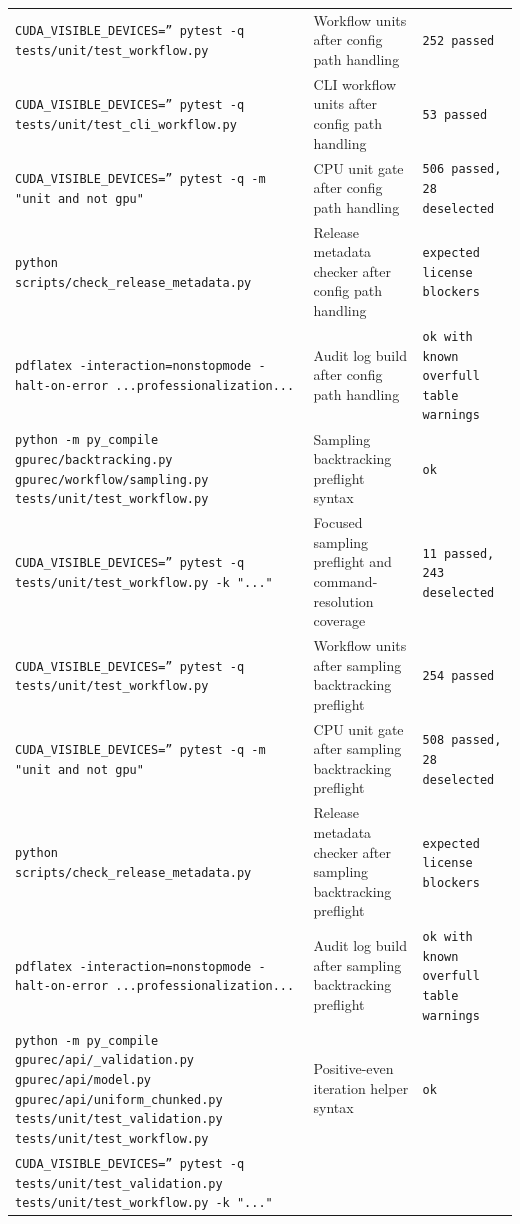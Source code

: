 \documentclass[11pt]{article}
\begin{document}
\begin{center}
\begin{tabular}{lll}
\texttt{CUDA\_VISIBLE\_DEVICES='' pytest -q tests/unit/test\_workflow.py} &
Workflow units after config path handling &
\texttt{252 passed} \\
\texttt{CUDA\_VISIBLE\_DEVICES='' pytest -q tests/unit/test\_cli\_workflow.py} &
CLI workflow units after config path handling &
\texttt{53 passed} \\
\texttt{CUDA\_VISIBLE\_DEVICES='' pytest -q -m "unit and not gpu"} &
CPU unit gate after config path handling &
\texttt{506 passed, 28 deselected} \\
\texttt{python scripts/check\_release\_metadata.py} &
Release metadata checker after config path handling &
\texttt{expected license blockers} \\
\texttt{pdflatex -interaction=nonstopmode -halt-on-error ...professionalization...} &
Audit log build after config path handling &
\texttt{ok with known overfull table warnings} \\
\texttt{python -m py\_compile gpurec/backtracking.py gpurec/workflow/sampling.py tests/unit/test\_workflow.py} &
Sampling backtracking preflight syntax &
\texttt{ok} \\
\texttt{CUDA\_VISIBLE\_DEVICES='' pytest -q tests/unit/test\_workflow.py -k "..."} &
Focused sampling preflight and command-resolution coverage &
\texttt{11 passed, 243 deselected} \\
\texttt{CUDA\_VISIBLE\_DEVICES='' pytest -q tests/unit/test\_workflow.py} &
Workflow units after sampling backtracking preflight &
\texttt{254 passed} \\
\texttt{CUDA\_VISIBLE\_DEVICES='' pytest -q -m "unit and not gpu"} &
CPU unit gate after sampling backtracking preflight &
\texttt{508 passed, 28 deselected} \\
\texttt{python scripts/check\_release\_metadata.py} &
Release metadata checker after sampling backtracking preflight &
\texttt{expected license blockers} \\
\texttt{pdflatex -interaction=nonstopmode -halt-on-error ...professionalization...} &
Audit log build after sampling backtracking preflight &
\texttt{ok with known overfull table warnings} \\
\texttt{python -m py\_compile gpurec/api/\_validation.py gpurec/api/model.py gpurec/api/uniform\_chunked.py tests/unit/test\_validation.py tests/unit/test\_workflow.py} &
Positive-even iteration helper syntax &
\texttt{ok} \\
\texttt{CUDA\_VISIBLE\_DEVICES='' pytest -q tests/unit/test\_validation.py tests/unit/test\_workflow.py -k "..."} &

\end{tabular}
\end{center}
\end{document}
